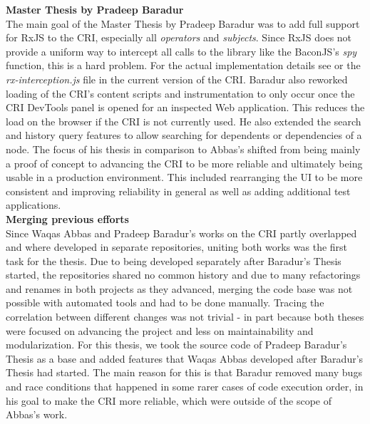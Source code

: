 	\noindent\textbf{Master Thesis by Pradeep Baradur}\\
	 \cite{ThesisBaradur} The main goal of the Master Thesis by Pradeep Baradur was to add full support for RxJS to the CRI, especially all \emph{operators} and \emph{subjects}. Since RxJS does not provide a uniform way to intercept all calls to the library like the BaconJS's \emph{spy} function, this is a hard problem. For the actual implementation details see \cite{ThesisBaradur} or the \emph{rx-interception.js} file in the current version of the CRI. Baradur also reworked loading of the CRI's content scripts and instrumentation to only occur once the CRI DevTools panel is opened for an inspected Web application. This reduces the load on the browser if the CRI is not currently used. He also extended the search and history query features to allow searching for dependents or dependencies of a node. The focus of his thesis in comparison to Abbas's shifted from being mainly a proof of concept to advancing the CRI to be more reliable and ultimately being usable in a production environment. This included rearranging the UI to be more consistent and improving reliability in general as well as adding additional test applications.\\		
		
	\noindent\textbf{Merging previous efforts}\\
	Since Waqas Abbas and Pradeep Baradur's works on the CRI partly overlapped and where developed in separate repositories, uniting both works was the first task for the thesis. Due to being developed separately after Baradur's Thesis started, the repositories shared no common history and due to many refactorings and renames in both projects as they advanced, merging the code base was not possible with automated tools and had to be done manually. Tracing the correlation between different changes was not trivial - in part because both theses were focused on advancing the project and less on maintainability and modularization. For this thesis, we took the source code of Pradeep Baradur's Thesis as a base and added features that Waqas Abbas developed after Baradur's Thesis had started. The main reason for this is that Baradur removed many bugs and race conditions that happened in some rarer cases of code execution order, in his goal to make the CRI more reliable, which were outside of the scope of Abbas's work.
		
